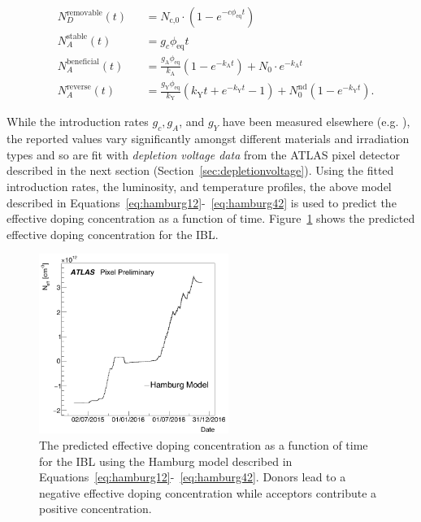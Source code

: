 \begin{align}
\label{eq:hamburg12}
&N_{D}^\text{removable}(t) &&=N_\text{c,0}\cdot \left( 1-e^{-c\phi_\text{eq}t} \right) \\ \label{eq:hamburg22}
&N_{A}^\text{stable}(t) &&= g_c \phi_\text{eq}t \\ \label{eq:hamburg32}
&N_{A}^\text{beneficial}(t)  &&=\frac{g_\text{A}\phi_\text{eq}}{k_\text{A}} \left( 1-e^{-k_\text{A}t} \right) + N_0 \cdot e^{-k_\text{A}t} \\ \label{eq:hamburg42}
&N_{A}^\text{reverse}(t)  &&= \frac{g_\text{Y}\phi_\text{eq}}{k_\text{Y}} \left( k_\text{Y}t + e^{-k_\text{Y}t} -1  \right) + N_0^\text{nd} \left( 1-e^{-k_\text{Y}t} \right).
\end{align}

While the introduction rates $g_c,g_A$, and $g_Y$ have been measured elsewhere (e.g. \cite{Lindstrom:421210}), the reported values vary significantly amongst different materials and irradiation types and so are fit with \textit{depletion voltage data} from the ATLAS pixel detector described in the next section (Section~\ref{sec:depletionvoltage}).  Using the fitted introduction rates, the luminosity, and temperature profiles, the above model described in Equations~\ref{eq:hamburg12}-~\ref{eq:hamburg42} is used to predict the effective doping concentration as a function of time.  Figure~\ref{fig:electricfield:neff} shows the predicted effective doping concentration for the IBL. 

\begin{figure}[!htpb]
\centering
\includegraphics[width=0.55\textwidth]{newneff_added.pdf}
\caption{The predicted effective doping concentration as a function of time for the IBL using the Hamburg model described in Equations~\ref{eq:hamburg12}-~\ref{eq:hamburg42}. Donors lead to a negative effective doping concentration while acceptors contribute a positive concentration.  }
\label{fig:electricfield:neff}
\end{figure}



